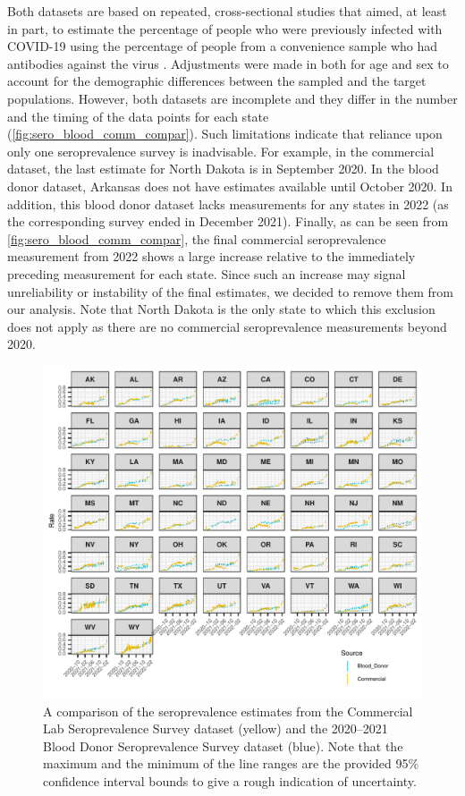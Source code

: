 \documentclass{article}
\begin{document}
Both datasets are based on repeated, cross-sectional studies that aimed, at
least in part, to estimate the percentage of people who were previously infected
with COVID-19 using the percentage of people from a convenience sample who had
antibodies against the virus \citep{bajema2021estimated, cdc2020data,
jones2021estimated}. Adjustments were made in both for age and sex to account
for the demographic differences between the sampled and the target populations.
However, both datasets are incomplete and they differ in the number and the
timing of the data points for each state (\autoref{fig:sero_blood_comm_compar}).
Such limitations indicate that reliance upon only one seroprevalence
survey is inadvisable.
For example, in the commercial dataset, the last estimate for North Dakota is in
September 2020. In the blood donor dataset, Arkansas does not have estimates
available until October 2020. In addition, this blood donor dataset lacks
measurements for any states in 2022 (as the corresponding survey ended in
December 2021). Finally, as can be seen from \autoref{fig:sero_blood_comm_compar},
the final commercial seroprevalence measurement from 2022 shows a large
increase relative to the immediately preceding measurement for each state. Since
such an increase may signal unreliability or instability of the final estimates,
we decided to remove them from our analysis. Note that North Dakota is the only
state to which this exclusion does not apply as there are no commercial seroprevalence
measurements beyond 2020.

\begin{figure}[!tb]
\centering
    \includegraphics[width=.99\textwidth]{sero_blood_comm_compar.pdf}
    \caption{A comparison of the seroprevalence estimates from the Commercial
    Lab Seroprevalence Survey dataset (yellow) and the 2020--2021 Blood Donor 
    Seroprevalence Survey dataset (blue). Note that the maximum and the minimum
    of the line ranges are the provided 95\% confidence interval bounds to 
    give a rough indication of uncertainty.}
    \label{fig:sero_blood_comm_compar}
\end{figure}
\end{document}
